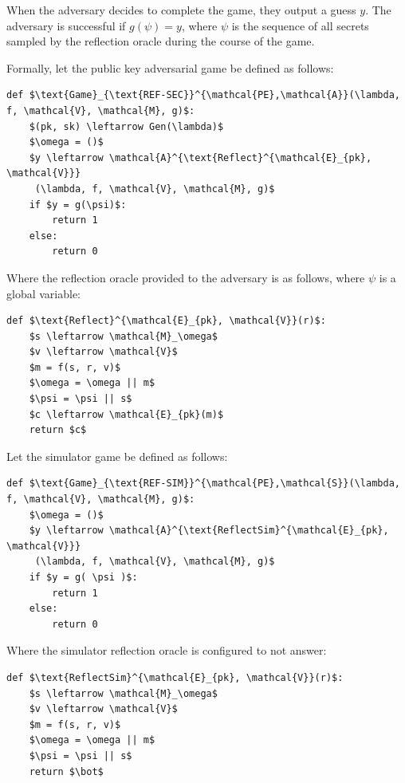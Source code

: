 \documentclass[conference, letterpaper, 10pt]{IEEEtran}
\begin{document}
When the adversary decides to complete the game, they output a guess $y$. The
adversary is successful if $g(\psi) = y$, where $\psi$ is the sequence
of all secrets sampled by the reflection oracle during the course of the game.

Formally, let the public key adversarial game be defined as follows:

\begin{lstlisting}[texcl,mathescape,basicstyle=\small]
def $\text{Game}_{\text{REF-SEC}}^{\mathcal{PE},\mathcal{A}}(\lambda, f, \mathcal{V}, \mathcal{M}, g)$:
    $(pk, sk) \leftarrow Gen(\lambda)$
    $\omega = ()$
    $y \leftarrow \mathcal{A}^{\text{Reflect}^{\mathcal{E}_{pk}, \mathcal{V}}}
     (\lambda, f, \mathcal{V}, \mathcal{M}, g)$
    if $y = g(\psi)$:
        return 1
    else:
        return 0
\end{lstlisting}

Where the reflection oracle provided to the adversary is as follows, where
$\psi$ is a global variable:

\begin{lstlisting}[texcl,mathescape,basicstyle=\small]
def $\text{Reflect}^{\mathcal{E}_{pk}, \mathcal{V}}(r)$:
    $s \leftarrow \mathcal{M}_\omega$
    $v \leftarrow \mathcal{V}$
    $m = f(s, r, v)$
    $\omega = \omega || m$
    $\psi = \psi || s$
    $c \leftarrow \mathcal{E}_{pk}(m)$
    return $c$
\end{lstlisting}

Let the simulator game be defined as follows:

\begin{lstlisting}[texcl,mathescape,basicstyle=\small]
def $\text{Game}_{\text{REF-SIM}}^{\mathcal{PE},\mathcal{S}}(\lambda, f, \mathcal{V}, \mathcal{M}, g)$:
    $\omega = ()$
    $y \leftarrow \mathcal{A}^{\text{ReflectSim}^{\mathcal{E}_{pk}, \mathcal{V}}}
     (\lambda, f, \mathcal{V}, \mathcal{M}, g)$
    if $y = g( \psi )$:
        return 1
    else:
        return 0
\end{lstlisting}

Where the simulator reflection oracle is configured to not answer:

\begin{lstlisting}[texcl,mathescape,basicstyle=\small]
def $\text{ReflectSim}^{\mathcal{E}_{pk}, \mathcal{V}}(r)$:
    $s \leftarrow \mathcal{M}_\omega$
    $v \leftarrow \mathcal{V}$
    $m = f(s, r, v)$
    $\omega = \omega || m$
    $\psi = \psi || s$
    return $\bot$
\end{lstlisting}
\end{document}
